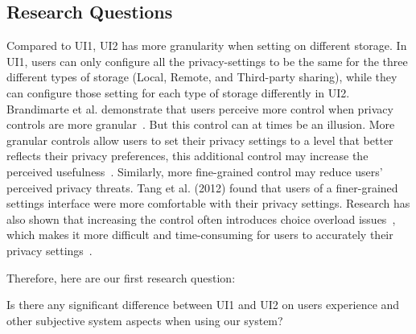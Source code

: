 \subsection{Research Questions}
%

Compared to UI1, UI2 has more granularity when setting on different storage. In UI1, users can only configure all the privacy-settings to be the same for the three different types of storage (Local, Remote, and Third-party sharing), while they can configure those setting for each type of storage differently in UI2. Brandimarte et al. demonstrate that users perceive more control when privacy controls are more granular~\cite{brandimarte2013misplaced}. But this control can at times be an illusion. More granular controls allow users to set their privacy settings to a level that better reflects their privacy preferences, this additional control may increase the perceived usefulness~\cite{tang2012implications, al2016modeling}. Similarly, more fine-grained control may reduce users' perceived privacy threats. Tang et al. (2012) found that users of a finer-grained settings interface were more comfortable with their privacy settings. Research has also shown that increasing the control often introduces choice overload issues~\cite{iyengar2000choice, schwartz2004paradox, acquisti2005privacy, acquisti2007can}, which makes it more difficult and time-consuming for users to accurately their privacy settings~\cite{madejski2012study, sadeh2009understanding}.

Therefore, here are our first research question:
\begin{theorem}
	Is there any significant difference between UI1 and UI2 on users experience and other subjective system aspects when using our system?
\end{theorem}

